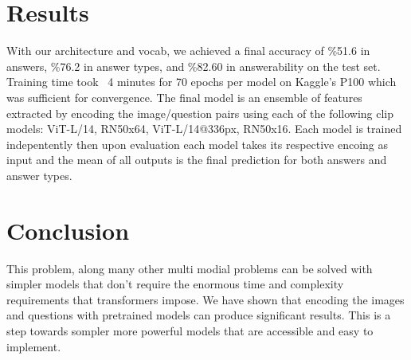 \documentclass[12pt]{IEEEtran}
\begin{document}
\section{Results}
With our architecture and vocab, we achieved a final accuracy of \%51.6  in answers, \%76.2 in answer types, and \%82.60 in answerability on the test set. Training time took ~4 minutes for 70 epochs per model on Kaggle’s P100 which was sufficient for convergence. The final model is an ensemble of features extracted by encoding the image/question pairs using each of the following clip models: ViT-L/14, RN50x64, ViT-L/14@336px, RN50x16. Each model is trained indepentently then upon evaluation each model takes its respective encoing as input and the mean of all outputs is the final prediction for both answers and answer types.

\section{Conclusion}
This problem, along many other multi modial problems can be solved with simpler models that don’t require the enormous time and complexity requirements that transformers impose. We have shown that encoding the images and questions with pretrained models can produce significant results. This is a step towards sompler more powerful models that are accessible and easy to implement.

\printbibliography
\end{document}
